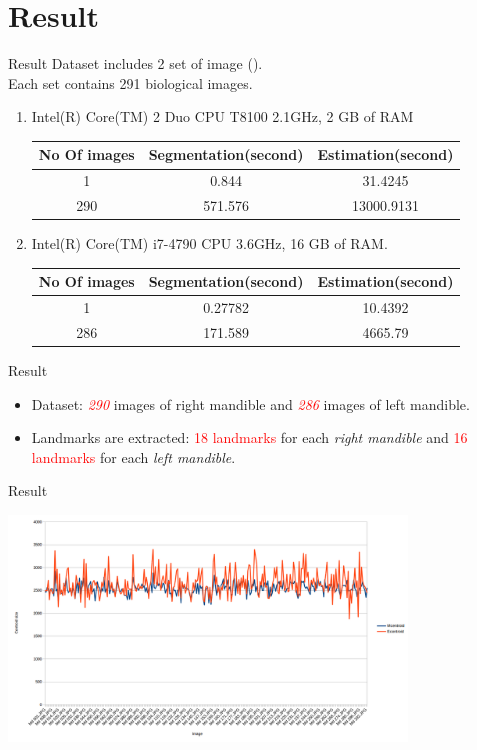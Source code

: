 \documentclass{beamer}
\begin{document}
\section{Result}
\begin{frame}{Result}
	Dataset includes 2 set of image ().\\
	Each set contains 291 biological images.
	\begin{enumerate}
		\item Intel(R) Core(TM) 2 Duo CPU T8100 2.1GHz, 2 GB of RAM
			\begin{center}
				\begin{tabular}{|c|c|c|}
					\hline
					No Of images & Segmentation(second) & Estimation(second) \\ \hline
					1 & 0.844 & 31.4245   \\ \hline
					290 & 571.576 & 13000.9131   \\ \hline
				\end{tabular}
			\end{center}
		\item Intel(R) Core(TM) i7-4790 CPU 3.6GHz, 16 GB of RAM.
			\begin{center}
			\begin{tabular}{|c|c|c|}
				\hline
				No Of images & Segmentation(second) & Estimation(second) \\ \hline
				1 & 0.27782 & 10.4392   \\ \hline
				286 & 171.589 & 4665.79   \\ \hline
			\end{tabular}
			\end{center}
	\end{enumerate}
\end{frame}
\begin{frame}{Result}
	\begin{itemize}
		\item Dataset: \textit{\textcolor{red}{290}} images of right mandible and \textit{\textcolor{red}{286}} images of left mandible.
		\item Landmarks are extracted: \textcolor{red}{18 landmarks} for each \textit{right mandible} and \textcolor{red}{16 landmarks} for each \textit{left mandible}.
	\end{itemize}
\end{frame}
\begin{frame}{Result}
	\begin{center}
		\includegraphics[height=6cm]{images/MdChart.png}	
	\end{center}
\end{frame}
\end{document}

